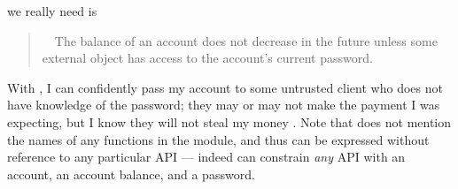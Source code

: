 { %
  we really need is
 \begin{quote}
\SrobustB\  \ The balance of an account does not  decrease in the future unless some external 
object  has access to the account's current password.
\end{quote}
With \SrobustB, I can confidently pass my account to some untrusted client who
  does not have
 knowledge of the password; they may or may not make the payment I was expecting, but I
 know they will not  steal my money \cite{ooToSecurity,miller-esop2013}.
 Note that \SrobustB  does not mention
 the names of any functions in the module, and 
 thus can be expressed without reference to any particular API ---
 indeed \SrobustB can constrain \emph{any} API with an account, an account
 balance, and a password. 


 
 

 

}
